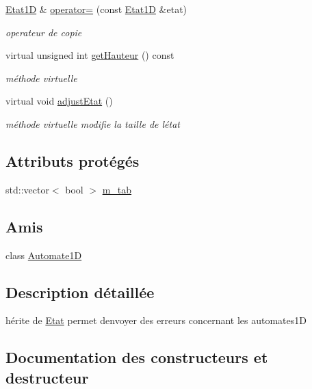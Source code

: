 \begin{DoxyCompactItemize}
\hyperlink{class_etat1_d}{Etat1D} \& \hyperlink{class_etat1_d_a4ce3b4931c766b2a6cdf6e3ac7590c5a}{operator=} (const \hyperlink{class_etat1_d}{Etat1D} \&etat)
\begin{DoxyCompactList}\small\item\em operateur de copie \end{DoxyCompactList}\item 
virtual unsigned int \hyperlink{class_etat1_d_aed8c9082f8caefeef7687ba1f4590f40}{get\+Hauteur} () const 
\begin{DoxyCompactList}\small\item\em méthode virtuelle \end{DoxyCompactList}\item 
virtual void \hyperlink{class_etat1_d_a95f0f0455d3dfda771330648ec5395fb}{adjust\+Etat} ()
\begin{DoxyCompactList}\small\item\em méthode virtuelle modifie la taille de l\textquotesingle{}état \end{DoxyCompactList}\end{DoxyCompactItemize}
\subsection*{Attributs protégés}
\begin{DoxyCompactItemize}
\item 
std\+::vector$<$ bool $>$ \hyperlink{class_etat1_d_a07068969d6d83e95a8d04363914adf33}{m\+\_\+tab}
\end{DoxyCompactItemize}
\subsection*{Amis}
\begin{DoxyCompactItemize}
\item 
class \hyperlink{class_etat1_d_a7b442c5e6a2ad84fcc725706d1f77dfe}{Automate1D}
\end{DoxyCompactItemize}


\subsection{Description détaillée}
hérite de \hyperlink{class_etat}{Etat} permet d\textquotesingle{}envoyer des erreurs concernant les automates1D 

\subsection{Documentation des constructeurs et destructeur}
